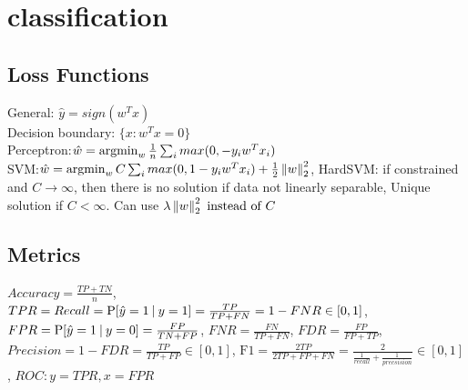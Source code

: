 \section{classification}

\subsection{Loss Functions}
General: $\hat y = sign(w^T x)$\\
Decision boundary: $\{x : w^Tx = 0\}$\\
Perceptron:$\hat w = \operatorname*{argmin}_w \frac{1}{n}\sum_i max(0, -y_iw^T x_i)$\\
SVM:$\hat w = \operatorname*{argmin}_w C\sum_i max(0, 1-y_iw^T x_i) + \frac{1}{2}\left\lVert w\right\rVert_2^2$,
HardSVM: if constrained and $C\rightarrow \infty$, then there is no solution if data not linearly separable,
Unique solution if $C<\infty$. Can use $\lambda\left\lVert w\right\rVert_2^2 \text{ instead of } C$


\subsection{Metrics}
$Accuracy = \frac{TP + TN}{n}$,
$TPR = Recall = \prob{\hat{y}=1}[y=1] =\frac{TP}{TP + FN} = 1-FNR \in [0, 1]$,
$FPR = \prob{\hat{y}=1}[y=0]= \frac{FP}{TN + FP} $,
$FNR = \frac{FN}{TP + FN}$,
$FDR = \frac{FP}{FP+TP}$,
$Precision = 1- FDR = \frac{TP}{TP + FP}\in [0, 1]$,
$\text{F1} = \frac{2TP}{2TP + FP + FN} = \frac{2}{\frac{1}{recall} + \frac{1}{precsision}} \in [0, 1]$,
$ROC: y=TPR, x=FPR$

